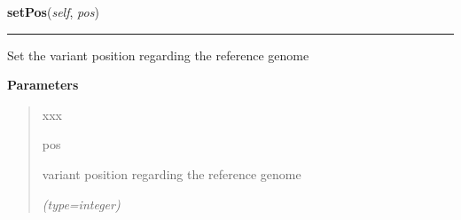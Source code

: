     \label{script-phyloFixedVar:var:setPos}

    \vspace{0.5ex}

\hspace{.8\funcindent}\begin{boxedminipage}{\funcwidth}

    \raggedright \textbf{setPos}(\textit{self}, \textit{pos})

    \vspace{-1.5ex}

    \rule{\textwidth}{0.5\fboxrule}
\setlength{\parskip}{2ex}
    Set the variant position regarding the reference genome

\setlength{\parskip}{1ex}
      \textbf{Parameters}
      \vspace{-1ex}

      \begin{quote}
        \begin{Ventry}{xxx}

          \item[pos]

          variant position regarding the reference genome

            {\it (type=integer)}

        \end{Ventry}

      \end{quote}

    \end{boxedminipage}

    \label{script-phyloFixedVar:var:setVar}

    \vspace{0.5ex}

